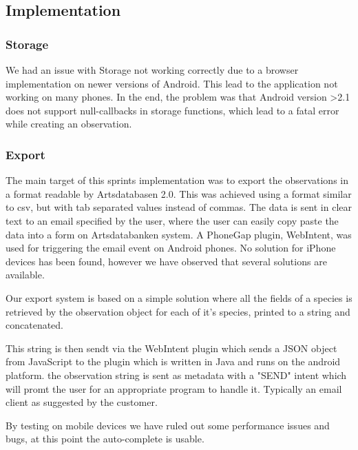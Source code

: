 \subsection{Implementation}

\subsubsection{Storage}

\label{sprint3:storage}

We had an issue with Storage not working correctly due to a browser
implementation on newer versions of Android. This lead to the application
not working on many  phones. In the end, the problem was that Android
version >2.1 does not support null-callbacks in storage functions, which
lead to a fatal error while creating an observation. 

	\subsubsection{Export}

	The main target of this sprints implementation was to export the
	observations in a format readable by Artsdatabasen 2.0. This was achieved
	using a format similar to csv, but with tab separated values instead of
	commas. The data is sent in clear text to an email specified by the user,
	where the user can easily copy paste the data into a form on Artsdatabanken
	system. A PhoneGap plugin, WebIntent, was used for triggering the email
	event on Android phones. No solution for iPhone devices has been found,
	however we have observed that several solutions are available.
	
	Our export system is based on a simple solution where all the fields of a species
	is retrieved by the observation object for each of it's species, printed to a string
	and concatenated.
	
	This string is then sendt via the WebIntent plugin which sends a JSON object from
	JavaScript to the plugin which is written in Java and runs on the android platform.
	the observation string is sent as metadata with a "SEND" intent which will promt 
	the user for an appropriate program to handle it. Typically an email client as
	suggested by the customer.

\label{Auto-complete}

By testing on mobile devices we have ruled out some performance issues and bugs,
at this point the auto-complete is usable.

